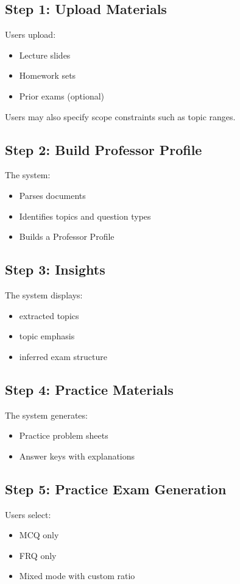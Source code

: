 \documentclass[11pt]{article}
\begin{document}
\subsection{Step 1: Upload Materials}
Users upload:
\begin{itemize}
\item Lecture slides
\item Homework sets
\item Prior exams (optional)
\end{itemize}

Users may also specify scope constraints such as topic ranges.

\subsection{Step 2: Build Professor Profile}
The system:
\begin{itemize}
\item Parses documents
\item Identifies topics and question types
\item Builds a Professor Profile
\end{itemize}

\subsection{Step 3: Insights}
The system displays:
\begin{itemize}
\item extracted topics
\item topic emphasis
\item inferred exam structure
\end{itemize}

\subsection{Step 4: Practice Materials}
The system generates:
\begin{itemize}
\item Practice problem sheets
\item Answer keys with explanations
\end{itemize}

\subsection{Step 5: Practice Exam Generation}
Users select:
\begin{itemize}
\item MCQ only
\item FRQ only
\item Mixed mode with custom ratio
\end{itemize}
\end{document}
